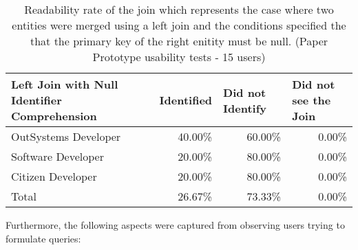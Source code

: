 \begin{table}[tb]
  \caption{Readability rate of the join which represents the case where two entities were merged using a left join and the conditions specified the that the primary key of the right enitity must be null. (Paper Prototype usability tests - 15 users)}
    \label{tab:paperPrototypeLeftJoinNull}
  \begin{tabular}{@{}m{5.4cm}rrr@{}}
  \toprule
  \textbf{Left Join with Null Identifier Comprehension} & \multicolumn{1}{l}{Identified} & \multicolumn{1}{l}{Did not Identify} & \multicolumn{1}{l}{Did not see the Join} \\ \midrule
  OutSystems Developer                                  & 40.00\%                        & 60.00\%                              & 0.00\%                                   \\
  Software Developer                                    & 20.00\%                        & 80.00\%                              & 0.00\%                                   \\
  Citizen Developer                                     & 20.00\%                        & 80.00\%                              & 0.00\%                                   \\
  Total                                                 & 26.67\%                        & 73.33\%                              & 0.00\%                                   \\ \bottomrule
  \end{tabular}
  \end{table}


Furthermore, the following aspects were captured from observing users trying to formulate queries:

